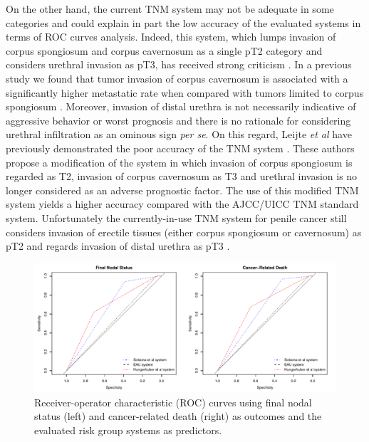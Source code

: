 \documentclass[11pt,letterpaper]{article}\usepackage[]{graphicx}\usepackage[]{color}
\makeatletter
\def\maxwidth{ %
  \ifdim\Gin@nat@width>\linewidth
    \linewidth
  \else
    \Gin@nat@width
  \fi
}
\newenvironment{knitrout}{}{} %
\makeatother
\begin{document}
\begin{multicols}{2}
On the other hand, the current TNM system may not be adequate in some categories and could explain in part the low accuracy of the evaluated systems in terms of ROC curves analysis. Indeed, this system, which lumps invasion of corpus spongiosum and corpus cavernosum as a single pT2 category and considers urethral invasion as pT3, has received strong criticism \cite{Leijte2008,Leijte2009}. In a previous study we found that tumor invasion of corpus cavernosum is associated with a significantly higher metastatic rate when compared with tumors limited to corpus spongiosum \cite{Chaux2009}. Moreover, invasion of distal urethra is not necessarily indicative of aggressive behavior or worst prognosis and there is no rationale for considering urethral infiltration as an ominous sign \emph{per se}. On this regard, Leijte \emph{et al} have previously demonstrated the poor accuracy of the TNM system \cite{Leijte2009}. These authors propose a modification of the system in which invasion of corpus spongiosum is regarded as T2, invasion of corpus cavernosum as T3 and urethral invasion is no longer considered as an adverse prognostic factor. The use of this modified TNM system yields a higher accuracy compared with the AJCC/UICC TNM standard system. Unfortunately the currently-in-use TNM system for penile cancer still considers invasion of erectile tissues (either corpus spongiosum or cavernosum) as pT2 and regards invasion of distal urethra as pT3 \cite{Hakenberg2015}.

\begin{figure}
\centering
\begin{knitrout}
\color{fgcolor}
\includegraphics[width=\maxwidth]{figure/ROC-1} 

\end{knitrout}
        \caption{Receiver-operator characteristic (ROC) curves using final nodal status (left) and cancer-related death (right) as outcomes and the evaluated risk group systems as predictors.}
        \label{fig:ROC}
\end{figure}


\end{multicols}
\end{document}
